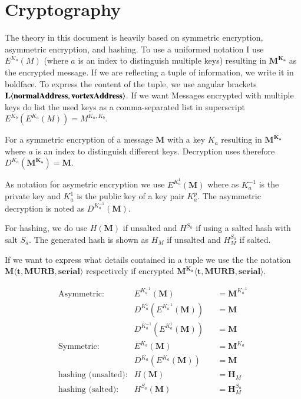 \section{Cryptography \label{sec:encNot}}
The theory in this document is heavily based on symmetric encryption, asymmetric encryption, and hashing. To use a uniformed notation I use $E^{K_a}(M)$ (where $a$ is an index to distinguish multiple keys) resulting in $\mathbf{M^{K_a}}$ as the encrypted message. If we are reflecting a tuple of information, we write it in boldface. To express the content of the tuple, we use angular brackets $\splitatcommas{\mathbf{L\langle normalAddress,vortexAddress\rangle }}$. If we want Messages encrypted with multiple keys do list the used keys as a comma-separated list in superscript $E^{K_b}\left(E^{K_a}\left(M\right)\right)=M^{{K_{a}},{K_b}}$.

For a symmetric encryption of a message $\mathbf{M}$ with a key $K_a$ resulting in $\mathbf{M^{K_a}}$ where $a$ is an index to distinguish different keys. Decryption uses therefore $D^{K_a}(\mathbf{M^{K_a}})=\mathbf{M}$.

As notation for asymetric encryption we use $E^{K^{1}_a}(\mathbf{M})$ where as $K^{-1}_a$ is the private key and $K^{1}_a$ is the public key of a key pair $K^p_a$. The asymmetric decryption is noted as $D^{K^{-1}_a}(\mathbf{M})$.

For hashing, we do use $H(\mathbf{M})$ if unsalted and $H^{S_a}$ if using a salted hash with salt $S_a$. The generated hash is shown as $H_M$ if unsalted and $H^{S_a}_M$ if salted.

If we want to express what details contained in a tuple we use the the notation $\mathbf{M\langle t,MURB,serial\rangle }$ respectively if encrypted $\mathbf{M^{K_{a}}\langle t,MURB,serial\rangle}$.

\begin{align*}
	\text{Asymmetric:}         & E^{K^{-1}_a}\left(\mathbf{M}\right)                            && =\mathbf{M}^{K^{-1}_a}\\
	& D^{K^{1}_a}\left(E^{K^{-1}_a}\left(\mathbf{M}\right)\right)    && =\mathbf{M}\\
	& D^{K^{-1}_a}\left(E^{K^{1}_a}\left(\mathbf{M}\right)\right)    && =\mathbf{M}\\
	\text{Symmetric:}          & E^{K_a}\left(\mathbf{M}\right)                                 && =\mathbf{M}^{K_a}\\
	& D^{K_a}\left(E^{K_a}\left(\mathbf{M}\right)\right)          && =\mathbf{M}\\
	\text{hashing (unsalted):}& H\left(\mathbf{M}\right)                                       && =\mathbf{H}_M\\
	\text{hashing (salted):}  & H^{S_a}\left(\mathbf{M}\right)                                 && =\mathbf{H}^{S_a}_M
\end{align*}

